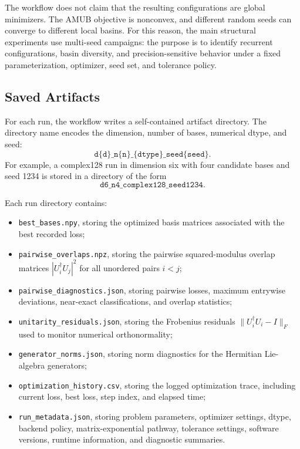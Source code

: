 \documentclass[a4paper,twocolumn,11pt,amsfonts,amssymb]{quantumarticle}
\begin{document}
The workflow does not claim that the resulting configurations are global minimizers. The AMUB objective is nonconvex, and different random seeds can converge to different local basins. For this reason, the main structural experiments use multi-seed campaigns: the purpose is to identify recurrent configurations, basin diversity, and precision-sensitive behavior under a fixed parameterization, optimizer, seed set, and tolerance policy.

\subsection{Saved Artifacts}

For each run, the workflow writes a self-contained artifact directory. The directory name encodes the dimension, number of bases, numerical dtype, and seed:
\[
\texttt{d\{d\}\_n\{n\}\_\{dtype\}\_seed\{seed\}}.
\]
For example, a complex128 run in dimension six with four candidate bases and seed 1234 is stored in a directory of the form
\[
\texttt{d6\_n4\_complex128\_seed1234}.
\]

Each run directory contains:
\begin{itemize}
    \item \texttt{best\_bases.npy}, storing the optimized basis matrices associated with the best recorded loss;
    \item \texttt{pairwise\_overlaps.npz}, storing the pairwise squared-modulus overlap matrices \( |U_i^\dagger U_j|^2 \) for all unordered pairs \(i<j\);
    \item \texttt{pairwise\_diagnostics.json}, storing pairwise losses, maximum entrywise deviations, near-exact classifications, and overlap statistics;
    \item \texttt{unitarity\_residuals.json}, storing the Frobenius residuals \( \|U_i^\dagger U_i - I\|_F \) used to monitor numerical orthonormality;
    \item \texttt{generator\_norms.json}, storing norm diagnostics for the Hermitian Lie-algebra generators;
    \item \texttt{optimization\_history.csv}, storing the logged optimization trace, including current loss, best loss, step index, and elapsed time;
    \item \texttt{run\_metadata.json}, storing problem parameters, optimizer settings, dtype, backend policy, matrix-exponential pathway, tolerance settings, software versions, runtime information, and diagnostic summaries.
\end{itemize}
\end{document}
